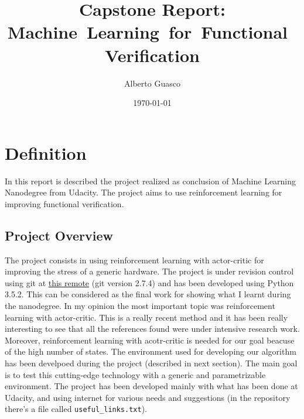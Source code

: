 \documentclass{article}
\title{Capstone Report: Machine~Learning~for~Functional~Verification}
\author{Alberto Guasco}
\date{\today}
\begin{document}
 
\maketitle

 
\section{Definition}
% 
In this report is described the project realized as conclusion of Machine Learning Nanodegree from Udacity. The project aims to use reinforcement learning for improving functional verification.

\subsection{Project Overview}
% 
% 
% 
The project consists in using reinforcement learning with actor-critic for improving the stress of a generic hardware. The project is under revision control using git at  \href{git@github.com:birio/capstone_project.git}{this remote} (git version 2.7.4) and has been developed using Python 3.5.2. This can be considered as the final work for showing what I learnt during the nanodegree. In my opinion the most important topic was reinforcement learning with actor-critic. This is a really recent method and it has been really interesting to see that all the references found were under intensive research work. Moreover, reinforcement learning with acotr-critic is needed for our goal beacuse of the high number of states. The environment used for developing our algorithm has been develpoed during the project (described in next section). The main goal is to test this cutting-edge technology with a generic and parametrizable environment. The project has been developed mainly with what has been done at Udacity, and using internet for various needs and suggestions (in the repository there's a file called \texttt{useful\_links.txt}).
\end{document}
